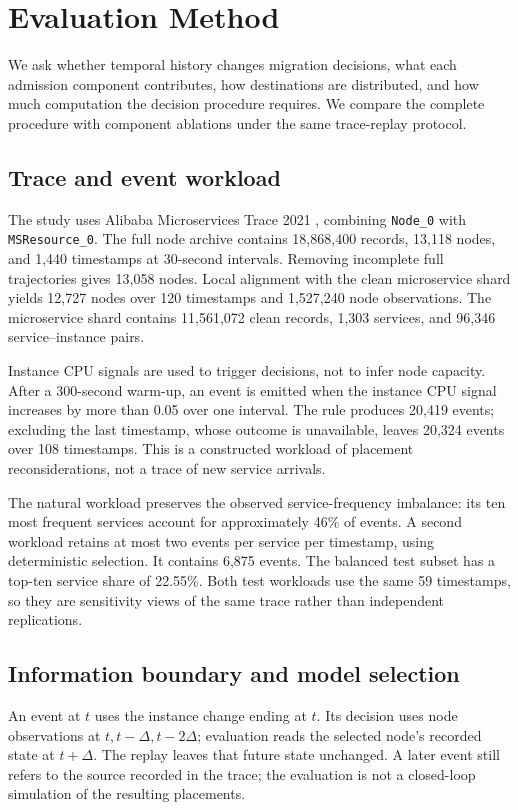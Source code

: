 \section{Evaluation Method}\label{sec:experimental}
We ask whether temporal history changes migration decisions, what each
admission component contributes, how destinations are distributed, and how
much computation the decision procedure requires. We compare the complete
procedure with component ablations under the same trace-replay protocol.

\subsection{Trace and event workload}
The study uses Alibaba Microservices Trace 2021
\citep{luo2021alibaba,alibaba2021trace}, combining \texttt{Node\_0} with
\texttt{MSResource\_0}. The full node archive contains 18,868,400 records,
13,118 nodes, and 1,440 timestamps at 30-second intervals. Removing
incomplete full trajectories gives 13,058 nodes. Local alignment with the
clean microservice shard yields 12,727 nodes over 120 timestamps and
1,527,240 node observations. The microservice shard contains 11,561,072
clean records, 1,303 services, and 96,346 service--instance pairs.

Instance CPU signals are used to trigger decisions, not to infer node
capacity. After a 300-second warm-up, an event is emitted when the instance
CPU signal increases by more than 0.05 over one interval. The rule produces
20,419 events; excluding the last timestamp, whose outcome is unavailable,
leaves 20,324 events over 108 timestamps. This is a constructed workload
of placement reconsiderations, not a trace of new service arrivals.

The natural workload preserves the observed service-frequency imbalance:
its ten most frequent services account for approximately 46\% of events.
A second workload retains at most two events per service per timestamp,
using deterministic selection. It contains 6,875 events. The balanced test
subset has a top-ten service share of 22.55\%. Both test workloads use the
same 59 timestamps, so they are sensitivity views of the same trace rather
than independent replications.

\subsection{Information boundary and model selection}
An event at $t$ uses the instance change ending at $t$. Its decision uses
node observations at $t,t-\Delta,t-2\Delta$; evaluation reads the selected
node's recorded state at $t+\Delta$. The replay leaves that future state
unchanged. A later event still refers to the source recorded in the trace;
the evaluation is not a closed-loop simulation of the resulting placements.

